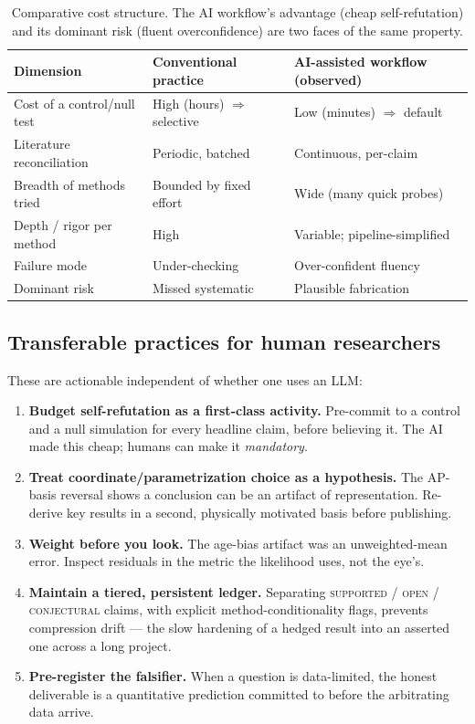 \documentclass[11pt]{article}
\begin{document}
\begin{table}[t]
\centering
\small
\begin{tabular}{@{}p{4.3cm}p{4.3cm}p{4.3cm}@{}}
\toprule
\textbf{Dimension} & \textbf{Conventional practice} & \textbf{AI-assisted workflow (observed)} \\
\midrule
Cost of a control/null test & High (hours) $\Rightarrow$ selective & Low (minutes) $\Rightarrow$ default \\
Literature reconciliation & Periodic, batched & Continuous, per-claim \\
Breadth of methods tried & Bounded by fixed effort & Wide (many quick probes) \\
Depth / rigor per method & High & Variable; pipeline-simplified \\
Failure mode & Under-checking & Over-confident fluency \\
Dominant risk & Missed systematic & Plausible fabrication \\
\bottomrule
\end{tabular}
\caption{Comparative cost structure. The AI workflow's advantage (cheap self-refutation) and its dominant risk (fluent overconfidence) are two faces of the same property.}
\label{tab:compare}
\end{table}

\subsection{Transferable practices for human researchers}
These are actionable independent of whether one uses an LLM:
\begin{enumerate}[leftmargin=1.4em,itemsep=2pt]
\item \textbf{Budget self-refutation as a first-class activity.} Pre-commit to a control and a null simulation for every headline claim, before believing it. The AI made this cheap; humans can make it \emph{mandatory}.
\item \textbf{Treat coordinate/parametrization choice as a hypothesis.} The AP-basis reversal shows a conclusion can be an artifact of representation. Re-derive key results in a second, physically motivated basis before publishing.
\item \textbf{Weight before you look.} The age-bias artifact was an unweighted-mean error. Inspect residuals in the metric the likelihood uses, not the eye's.
\item \textbf{Maintain a tiered, persistent ledger.} Separating \textsc{supported} / \textsc{open} / \textsc{conjectural} claims, with explicit method-conditionality flags, prevents compression drift --- the slow hardening of a hedged result into an asserted one across a long project.
\item \textbf{Pre-register the falsifier.} When a question is data-limited, the honest deliverable is a quantitative prediction committed to before the arbitrating data arrive.
\end{enumerate}
\end{document}
